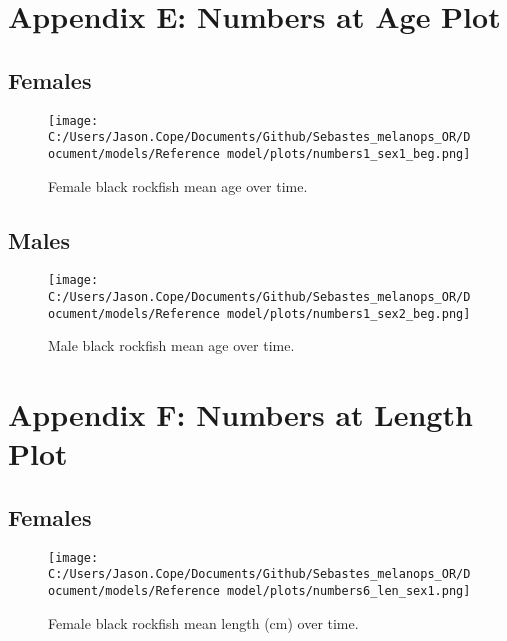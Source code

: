 \documentclass[11pt,
  english,
  letterpaper,
]{article}
\begin{document}
\clearpage

\hypertarget{app-e}{%
\section{Appendix E: Numbers at Age Plot}\label{app-e}}

\hypertarget{females}{%
\subsection{Females}\label{females}}

\begin{figure}
\centering
\texttt{[image: C:/Users/Jason.Cope/Documents/Github/Sebastes\_melanops\_OR/Document/models/Reference model/plots/numbers1\_sex1\_beg.png]}
\caption{Female black rockfish mean age over time.\label{fig:num_age_females}}
\end{figure}

\hypertarget{males}{%
\subsection{Males}\label{males}}

\begin{figure}
\centering
\texttt{[image: C:/Users/Jason.Cope/Documents/Github/Sebastes\_melanops\_OR/Document/models/Reference model/plots/numbers1\_sex2\_beg.png]}
\caption{Male black rockfish mean age over time.\label{fig:num_age_males}}
\end{figure}

\clearpage

\hypertarget{app-f}{%
\section{Appendix F: Numbers at Length Plot}\label{app-f}}

\hypertarget{females-1}{%
\subsection{Females}\label{females-1}}

\begin{figure}
\centering
\texttt{[image: C:/Users/Jason.Cope/Documents/Github/Sebastes\_melanops\_OR/Document/models/Reference model/plots/numbers6\_len\_sex1.png]}
\caption{Female black rockfish mean length (cm) over time.\label{fig:num_lts_females}}
\end{figure}
\end{document}

